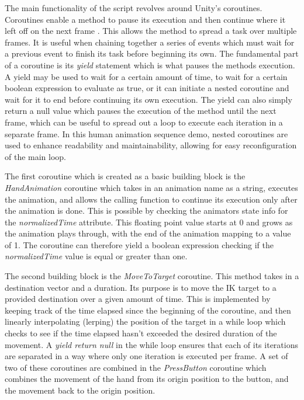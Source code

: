 The main functionality of the script revolves around Unity's coroutines.
Coroutines enable a method to pause its execution and then continue where it
left off on the next frame \cite{unity_coroutines}. This allows the method to
spread a task over multiple frames. It is useful when chaining together a series
of events which must wait for a previous event to finish its task before
beginning its own. The fundamental part of a coroutine is its \textit{yield}
statement which is what pauses the methods execution. A yield may be used to
wait for a certain amount of time, to wait for a certain boolean expression to
evaluate as true, or it can initiate a nested coroutine and wait for it to end
before continuing its own execution. The yield can also simply return a null
value which pauses the execution of the method until the next frame, which can
be useful to spread out a loop to execute each iteration in a separate frame. In
this human animation sequence demo, nested coroutines are used to enhance
readability and maintainability, allowing for easy reconfiguration of the main
loop. 

The first coroutine which is created as a basic building block is the
\textit{HandAnimation} coroutine which takes in an animation name as a string,
executes the animation, and allows the calling function to continue its
execution only after the animation is done. This is possible by checking the
animators state info for the \textit{normalizedTime} attribute. This floating
point value starts at 0 and grows as the animation plays through, with the end
of the animation mapping to a value of 1. The coroutine can therefore yield
a boolean expression checking if the \textit{normalizedTime} value is equal or
greater than one. 

The second building block is the \textit{MoveToTarget} coroutine. This method
takes in a destination vector and a duration. Its purpose is to move the IK
target to a provided destination over a given amount of time. This is
implemented by keeping track of the time elapsed since the beginning of the
coroutine, and then linearly interpolating (lerping) the position of the target
in a while loop which checks to see if the time elapsed hasn't exceeded the
desired duration of the movement. A \textit{yield return null} in the while loop
ensures that each of its iterations are separated in a way where only one
iteration is executed per frame. A set of two of these coroutines are combined
in the \textit{PressButton} coroutine which combines the movement of the hand
from its origin position to the button, and the movement back to the origin
position.

